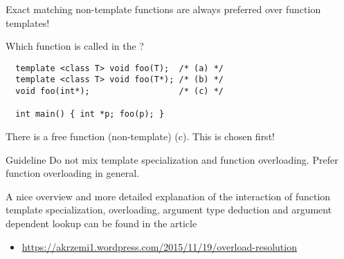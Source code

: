 Exact matching non-template functions are always preferred over function templates!

\begin{example}
  Which function is called in the ?
  \begin{verbatim}
  template <class T> void foo(T);  /* (a) */
  template <class T> void foo(T*); /* (b) */
  void foo(int*);                  /* (c) */

  int main() { int *p; foo(p); }
  \end{verbatim}
  There is a free function (non-template) (c). This is chosen first!
\end{example}

\begin{guideline}{Guideline}
  Do not mix template specialization and function overloading. Prefer function overloading in general.
\end{guideline}

\begin{rem}
  A nice overview and more detailed explanation of the interaction of function template specialization, overloading, argument type deduction and
  argument dependent lookup can be found in the article\begin{itemize}
	  \item \url{https://akrzemi1.wordpress.com/2015/11/19/overload-resolution}
  \end{itemize}
\end{rem}

